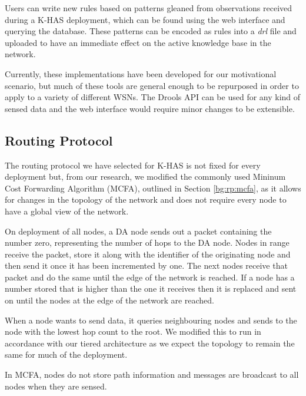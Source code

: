 	Users can write new rules based on patterns gleaned from observations received during a K-HAS deployment, which can be found using the web interface and querying the database. These patterns can be encoded as rules into a \textit{drl} file and uploaded to have an immediate effect on the active knowledge base in the network. 
	
	Currently, these implementations have been developed for our motivational scenario, but much of these tools are general enough to be repurposed in order to apply to a variety of different WSNs. The Drools API can be used for any kind of sensed data and the web interface would require minor changes to be extensible.

	\subsection{Routing Protocol}\label{arch:routing}
		The routing protocol we have selected for K-HAS is not fixed for every deployment but, from our research, we modified the commonly used Mininum Cost Forwarding Algorithm (MCFA), outlined in Section \ref{bg:rp:mcfa}, as it allows for changes in the topology of the network and does not require every node to have a global view of the network.

		On deployment of all nodes, a DA node sends out a packet containing the number zero, representing the number of hops to the DA node. Nodes in range receive the packet, store it along with the identifier of the originating node and then send it once it has been incremented by one. The next nodes receive that packet and do the same until the edge of the network is reached. If a node has a number stored that is higher than the one it receives then it is replaced and sent on until the nodes at the edge of the network are reached.

		When a node wants to send data, it queries neighbouring nodes and sends to the node with the lowest hop count to the root. We modified this to run in accordance with our tiered architecture as we expect the topology to remain the same for much of the deployment.

		In MCFA, nodes do not store path information and messages are broadcast to all nodes when they are sensed.

